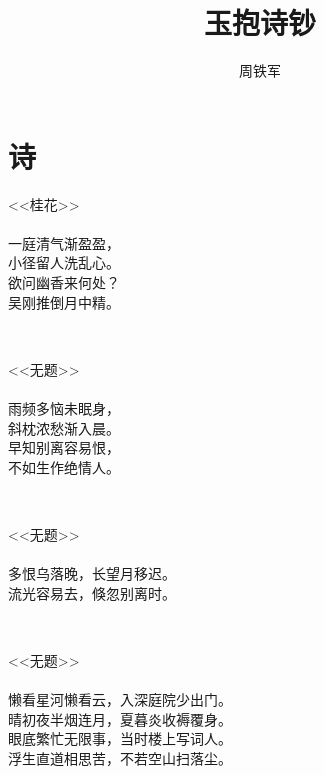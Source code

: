 \documentclass[12pt,a4paper]{article}
\title{玉抱诗钞}
\author{周铁军}
\date{\chntoday}
\begin{document}
\maketitle
\newpage
\section*{诗}

\begin{center}
<<桂花>>\\
\qquad\\
一庭清气渐盈盈，\\
小径留人洗乱心。\\
欲问幽香来何处？\\
吴刚推倒月中精。\\
\end{center}
\qquad\\
\begin{center}
<<无题>>\\
\qquad\\
雨频多恼未眠身，\\
斜枕浓愁渐入晨。\\
早知别离容易恨，\\
不如生作绝情人。\\
\end{center}
\qquad\\
\begin{center}
<<无题>>\\
\qquad\\
多恨乌落晚，长望月移迟。\\
流光容易去，倏忽别离时。\\
\end{center}
\qquad\\
\begin{center}
	<<无题>>\\
	\qquad\\
懒看星河懒看云，入深庭院少出门。\\
晴初夜半烟连月，夏暮炎收褥覆身。\\
眼底繁忙无限事，当时楼上写词人。\\
浮生直道相思苦，不若空山扫落尘。\\
\end{center}
\qquad\\
\end{document}
